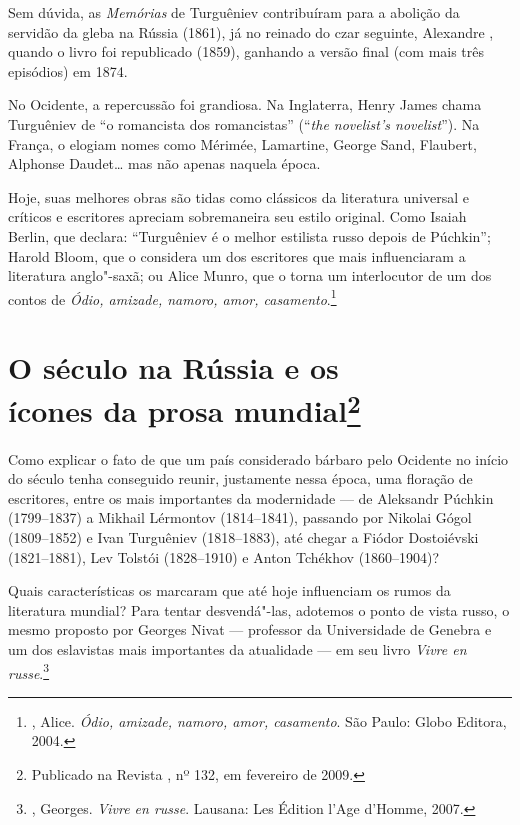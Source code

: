Sem dúvida, as \emph{Memórias} de Turguêniev contribuíram para a abolição da servidão da gleba na Rússia (1861), já no reinado do czar seguinte, Alexandre , quando o livro foi republicado (1859), ganhando a versão final (com mais três episódios) em 1874.

No Ocidente, a repercussão foi grandiosa. Na Inglaterra, Henry James chama Turguêniev de ``o romancista dos romancistas'' (``\emph{the novelist's novelist}''). Na França, o elogiam nomes como Mérimée, Lamartine, George Sand, Flaubert, Alphonse Daudet\ldots{} mas não apenas naquela época.

Hoje, suas melhores obras são tidas como clássicos da literatura universal e críticos e escritores apreciam sobremaneira seu estilo original. Como Isaiah Berlin, que declara: ``Turguêniev é o melhor estilista russo depois de Púchkin''; Harold Bloom, que o considera um dos escritores que mais influenciaram a literatura anglo"-saxã; ou Alice Munro, que o torna um interlocutor de um dos contos de \emph{Ódio, amizade, namoro, amor, casamento}.\footnote{, Alice. \emph{Ódio, amizade, namoro, amor, casamento}. São Paulo: Globo Editora, 2004.}

\chapter{O século \protect{} na Rússia e os\\ ícones da prosa mundial\footnote{Publicado na Revista \protect{}, nº 132, em fevereiro de 2009.}}
\label{prosamundial}

Como explicar o fato de que um país considerado bárbaro pelo Ocidente no
início do século  tenha conseguido reunir, justamente nessa época,
uma floração de escritores, entre os mais importantes da modernidade ---
de Aleksandr Púchkin (1799--1837) a Mikhail Lérmontov (1814--1841),
passando por Nikolai Gógol (1809--1852) e Ivan Turguêniev (1818--1883),
até chegar a Fiódor Dostoiévski (1821--1881), Lev Tolstói (1828--1910) e Anton Tchékhov (1860--1904)?

Quais características os marcaram que até hoje influenciam os rumos da literatura mundial? Para tentar desvendá"-las, adotemos o ponto de vista russo, o mesmo proposto por Georges Nivat --- professor da Universidade de Genebra e um dos eslavistas mais importantes da atualidade --- em seu livro \emph{Vivre en russe}.\footnote{, Georges. \emph{Vivre en russe}. Lausana: Les Édition l'Age d'Homme, 2007.}

